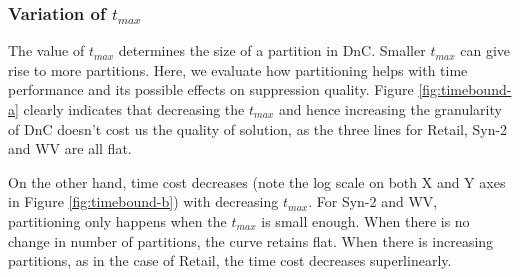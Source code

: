 \subsubsection{Variation of $t_{max}$}\label{sec:eval:timebound}
The value of $t_{max}$ determines the size of a partition in DnC. Smaller
$t_{max}$ can give rise to more partitions. Here, we
evaluate how partitioning helps with time performance and
its possible effects on suppression quality.
Figure \ref{fig:timebound-a} clearly indicates that decreasing the $t_{max}$ and
hence increasing the granularity of DnC doesn't cost us the quality of solution, as
the three lines for Retail, Syn-2 and WV are all flat.

On the other hand,
time cost decreases (note the log scale on both X and Y axes in
Figure \ref{fig:timebound-b}) with decreasing $t_{max}$. For Syn-2 and WV,
partitioning only happens when the $t_{max}$ is small enough. When there is
no change in number of partitions, the curve retains flat.
When there is increasing partitions, as in the case of Retail, the time cost
decreases superlinearly. 



